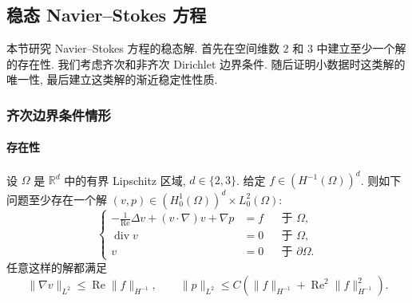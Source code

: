 \clearpage
\subsection{稳态 Navier--Stokes 方程}
\label{sec:chap5-steady-navier-stokes}
\renewcommand{\thestatement}{3.\arabic{statement}}
\renewcommand{\theHstatement}{ch05.sec03.\arabic{statement}}
\setcounter{statement}{0}
\renewcommand{\thechapterfivesectionthreeremark}{3.\arabic{chapterfivesectionthreeremark}}

本节研究 Navier--Stokes 方程的稳态解. 首先在空间维数 $2$ 和 $3$ 中建立至少一个解的存在性. 我们考虑齐次和非齐次 Dirichlet 边界条件. 随后证明小数据时这类解的唯一性, 最后建立这类解的渐近稳定性性质.

\subsubsection{齐次边界条件情形}
\label{subsec:chap5-steady-homogeneous-boundary}

\paragraph{存在性}
\label{subsec:chap5-steady-homogeneous-existence}

\begin{Theorem}
\label{thm:chap5-steady-homogeneous-existence}
设 $\Omega$ 是 $\mathbb R^d$ 中的有界 Lipschitz 区域, $d\in\{2,3\}$. 给定 $f\in(H^{-1}(\Omega))^d$. 则如下问题至少存在一个解 $(v,p)\in(H_0^1(\Omega))^d\times L_0^2(\Omega)$:
\begin{equation}
\left\{
\begin{aligned}
 -\frac1{\operatorname{Re}}\Delta v+(v\cdot\nabla)v+\nabla p&=f&&\text{于 }\Omega,\\
 \operatorname{div}v&=0&&\text{于 }\Omega,\\
 v&=0&&\text{于 }\partial\Omega.
\end{aligned}
\right.
\label{eq:chap5-steady-homogeneous-problem}
\end{equation}
任意这样的解都满足
\[
 \|\nabla v\|_{L^2}\leq\operatorname{Re}\|f\|_{H^{-1}},
 \qquad
 \|p\|_{L^2}\leq C\left(\|f\|_{H^{-1}}+\operatorname{Re}^2\|f\|_{H^{-1}}^2\right).
\]
\end{Theorem}

